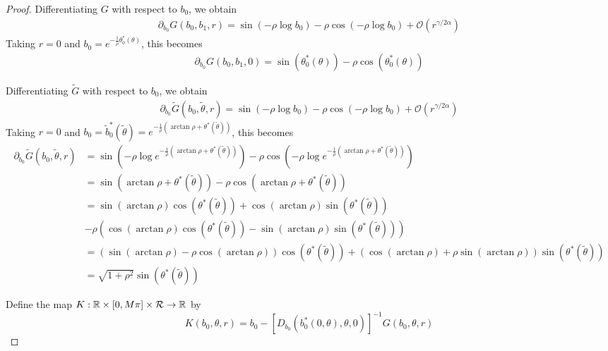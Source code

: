 \documentclass[thesis.tex]{subfiles}
\begin{document}
\begin{lemma}
\begin{proof}
Differentiating $G$ with respect to $b_0$, we obtain
\begin{align*}
\partial_{b_0} G(b_0, b_1, r) = \sin(-\rho \log b_0) - \rho \cos(-\rho \log b_0) + \mathcal{O}(r^{\gamma/2\alpha})
\end{align*}
Taking $r = 0$ and $b_0 = e^{-\frac{1}{\rho}\theta_0^*(\theta)}$, this becomes
\begin{align*}
\partial_{b_0} G(b_0, b_1, 0) = \sin(\theta_0^*(\theta)) - \rho \cos(\theta_0^*(\theta)) 
\end{align*}


Differentiating $\tilde{G}$ with respect to $b_0$, we obtain
\begin{align*}
\partial_{b_0} \tilde{G}(b_0, \tilde{\theta}, r) = \sin(-\rho \log b_0) - \rho \cos(-\rho \log b_0) + \mathcal{O}(r^{\gamma/2\alpha})
\end{align*}
Taking $r = 0$ and $b_0 = \tilde{b}_0^*(\tilde{\theta}) = e^{-\frac{1}{\rho}(\arctan \rho + \theta^*(\tilde{\theta}))}$, this becomes
\begin{align*}
\partial_{b_0} \tilde{G}(b_0, \tilde{\theta}, r) &= \sin\left(-\rho \log e^{-\frac{1}{\rho}(\arctan \rho + \theta^*(\tilde{\theta}))}\right) - \rho \cos\left(-\rho \log e^{-\frac{1}{\rho}(\arctan \rho + \theta^*(\tilde{\theta}))}\right) \\
&= \sin\left(\arctan \rho + \theta^*(\tilde{\theta})\right) - \rho \cos\left(\arctan \rho + \theta^*(\tilde{\theta}) \right) \\
&= \sin(\arctan \rho)\cos(\theta^*(\tilde{\theta})) + \cos(\arctan \rho)\sin(\theta^*(\tilde{\theta}))\\
&- \rho( \cos(\arctan \rho)\cos(\theta^*(\tilde{\theta})) - \sin(\arctan \rho)\sin(\theta^*(\tilde{\theta})) ) \\
&= (\sin(\arctan \rho) - \rho \cos(\arctan \rho))\cos(\theta^*(\tilde{\theta})) + (\cos(\arctan \rho) + \rho \sin(\arctan \rho))\sin(\theta^*(\tilde{\theta})) \\
&= \sqrt{1 + \rho^2} \sin(\theta^*(\tilde{\theta})) 
\end{align*}



Define the map $K: {\mathbb R} \times [0, M \pi] \times \mathcal{R} \rightarrow {\mathbb R}$ by
\begin{equation}\label{defK}
K(b_0, \theta, r) = b_0 - [D_{b_0}(b_0^*(0, \theta), \theta, 0)]^{-1}G(b_0, \theta, r)
\end{equation}

\end{proof}
\end{lemma} 
\end{document}

